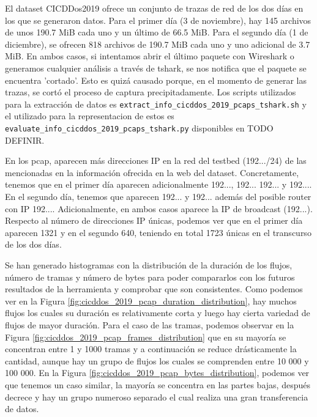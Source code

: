 El dataset CICDDos2019 ofrece un conjunto de trazas de red de los dos días en los que se generaron datos. Para el primer día (3 de noviembre), hay 145 archivos de unos 190.7 MiB cada uno y un último de 66.5 MiB. Para el segundo día (1 de diciembre), se ofrecen 818 archivos de 190.7 MiB cada uno y uno adicional de 3.7 MiB. En ambos casos, si intentamos abrir el último paquete con Wireshark o generamos cualquier análisis a través de tshark, se nos notifica que el paquete se encuentra 'cortado'. Esto es quizá causado porque, en el momento de generar las trazas, se cortó el proceso de captura precipitadamente. Los scripts utilizados para la extracción de datos es \texttt{extract\_info\_cicddos\_2019\_pcaps\_tshark.sh} y el utilizado para la representacion de estos es \texttt{evaluate\_info\_cicddos\_2019\_pcaps\_tshark.py} disponibles en TODO DEFINIR.

En los pcap, aparecen más direcciones IP en la red del testbed (192.../24) de las mencionadas en la información ofrecida en la web del dataset. Concretamente, tenemos que en el primer día aparecen adicionalmente 192..., 192... 192... y 192.... En el segundo día, tenemos que aparecen 192... y 192... además del posible router con IP 192.... Adicionalmente, en ambos casos aparece la IP de broadcast (192...). Respecto al número de direcciones IP únicas, podemos ver que en el primer día aparecen 1321 y en el segundo 640, teniendo en total 1723 únicas en el transcurso de los dos días. 

Se han generado histogramas con la distribución de la duración de los flujos, número de tramas y número de bytes para poder compararlos con los futuros resultados de la herramienta y comprobar que son consistentes. Como podemos ver en la Figura \ref{fig:cicddos_2019_pcap_duration_distribution}, hay muchos flujos los cuales su duración es relativamente corta y luego hay cierta variedad de flujos de mayor duración. Para el caso de las tramas, podemos observar en la Figura \ref{fig:cicddos_2019_pcap_frames_distribution} que en su mayoría se concentran entre 1 y 1000 tramas y a continuación se reduce drásticamente la cantidad, aunque hay un grupo de flujos los cuales se comprenden entre 10 000 y 100 000. En la Figura \ref{fig:cicddos_2019_pcap_bytes_distribution}, podemos ver que tenemos un caso similar, la mayoría se concentra en las partes bajas, después decrece y hay un grupo numeroso separado el cual realiza una gran transferencia de datos.

